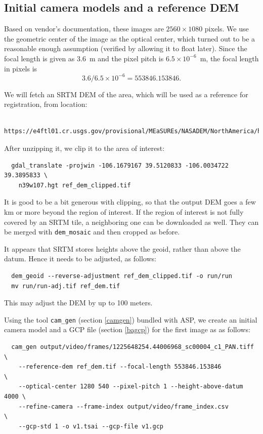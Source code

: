 \subsection{Initial camera models and a reference DEM}
\label{refdem}

Based on vendor's documentation, these images are $2560 \times 1080$
pixels.  We use the geometric center of the image as the optical center,
which turned out to be a reasonable enough assumption (verified by
allowing it to float later). Since the focal length is given as 3.6~m and
the pixel pitch is $6.5 \times 10^{-6}$~m, the focal length in pixels is
$$
  3.6/6.5 \times 10^{-6} = 553846.153846. 
$$

We will fetch an SRTM DEM of the area, which will be used as a reference
for registration, from location: 

\begin{verbatim}
  https://e4ftl01.cr.usgs.gov/provisional/MEaSUREs/NASADEM/NorthAmerica/hgt_merge/n39w107.hgt.zip
\end{verbatim}

After unzipping it, we clip it to the area of interest:

\begin{verbatim}
  gdal_translate -projwin -106.1679167 39.5120833 -106.0034722 39.3895833 \
    n39w107.hgt ref_dem_clipped.tif
\end{verbatim}

It is good to be a bit generous with clipping, so that the output DEM
goes a few km or more beyond the region of interest. If the region of
interest is not fully covered by an SRTM tile, a neighboring one can be
downloaded as well.  They can be merged with \texttt{dem\_mosaic} and
then cropped as before.

It appears that SRTM stores heights above the geoid, rather than above the datum.
Hence it needs to be adjusted, as follows:

\begin{verbatim}
  dem_geoid --reverse-adjustment ref_dem_clipped.tif -o run/run 
  mv run/run-adj.tif ref_dem.tif
\end{verbatim}

This may adjust the DEM by up to 100 meters. 

Using the tool \texttt{cam\_gen} (section \ref{camgen}) 
bundled with ASP, we create an initial camera model and a GCP file (section \ref{bagcp})
for the first image as as follows:

\begin{verbatim}
  cam_gen output/video/frames/1225648254.44006968_sc00004_c1_PAN.tiff   \
    --reference-dem ref_dem.tif --focal-length 553846.153846            \
    --optical-center 1280 540 --pixel-pitch 1 --height-above-datum 4000 \
    --refine-camera --frame-index output/video/frame_index.csv          \
    --gcp-std 1 -o v1.tsai --gcp-file v1.gcp
\end{verbatim}

